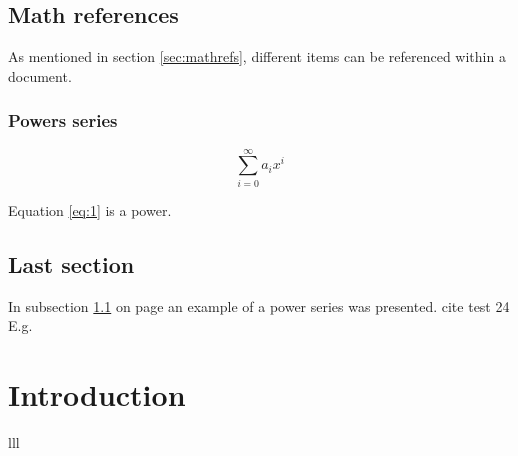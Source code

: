 \documentclass{article}
\begin{document}
\section{Math references} 
\label{mathrefs}
As mentioned in section \ref{sec:mathrefs}, different items can be referenced within a document.

\subsection{Powers series} 
		\label{sec:subsection}

		\begin{equation} 
	\label{eq:1}
\sum_{i=0}^{\infty} a_i x^i
\end{equation}

Equation \ref{eq:1} is a power.
\vspace{0.5cm}


\section{Last section}
In subsection \ref{sec:subsection} on page \pageref{eq:1} an example of a power series was presented.
cite test 24 E.g.


\chapter{Introduction} %


\begin{symbols}{lll} %
\end{symbols}
\end{document}

